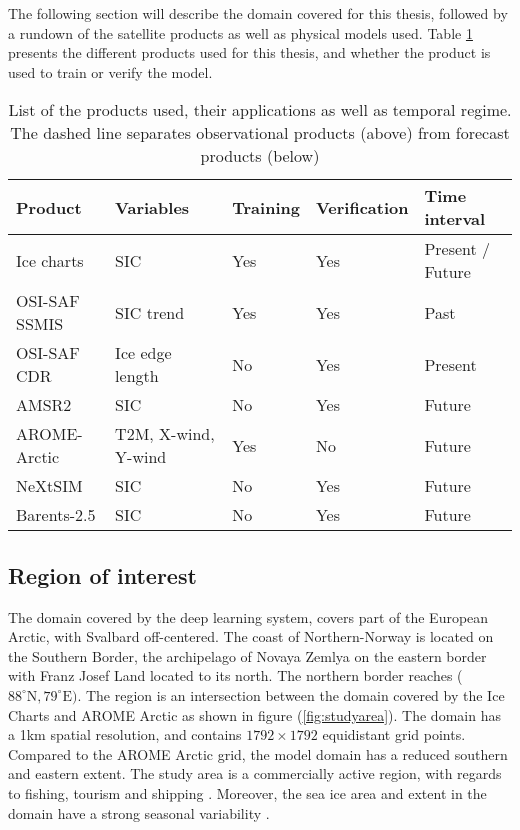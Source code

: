 \documentclass[../main/thesis.tex]{subfiles}
\begin{document}
The following section will describe the domain covered for this thesis, followed by a rundown of the satellite products as well as physical models used. Table \ref{tab:data_overview} presents the different products used for this thesis, and whether the product is used to train or verify the model.

\begin{table}[]
    \caption{\label{tab:data_overview}List of the products used, their applications as well as temporal regime. The dashed line separates observational products (above) from forecast products (below)}
    \centering
    \setlength{\arrayrulewidth}{0.5mm}
    \renewcommand{\arraystretch}{1.3}
    \begin{tabular}{lllll}
    \hline
    Product             & Variables           & Training & Verification & Time interval\\
    \hline
    Ice charts          & SIC                 & Yes      & Yes & Present / Future         \\
    OSI-SAF SSMIS       & SIC trend           & Yes      & Yes & Past          \\
    OSI-SAF CDR         & Ice edge length     & No       & Yes & Present         \\
    AMSR2               & SIC                 & No       & Yes & Future         \\
    \hdashline
    AROME-Arctic        & T2M, X-wind, Y-wind & Yes      & No  & Future         \\
    NeXtSIM             & SIC                 & No       & Yes & Future         \\
    Barents-2.5         & SIC                 & No       & Yes & Future         \\
    \hline         
    \end{tabular}
\end{table}


\subsection{Region of interest}
\label{sec:roi}
The domain covered by the deep learning system, covers part of the European Arctic, with Svalbard off-centered. The coast of Northern-Norway is located on the Southern Border, the archipelago of Novaya Zemlya on the eastern border with Franz Josef Land located to its north. The northern border reaches ($88^\circ \text{N}, 79^\circ \text{E})$. The region is an intersection between the domain covered by the Ice Charts \citep{Dinessen2020} and AROME Arctic \citep{Mueller2017} as shown in figure (\ref{fig:studyarea}). The domain has a 1km spatial resolution, and contains $1792 \times 1792$ equidistant grid points. Compared to the AROME Arctic grid, the model domain has a reduced southern and eastern extent. The study area is a commercially active region, with regards to fishing, tourism and shipping \citep{Wagner2020}. Moreover, the sea ice area and extent in the domain have a strong seasonal variability \citep{Cavalieri2012}.
\end{document}
